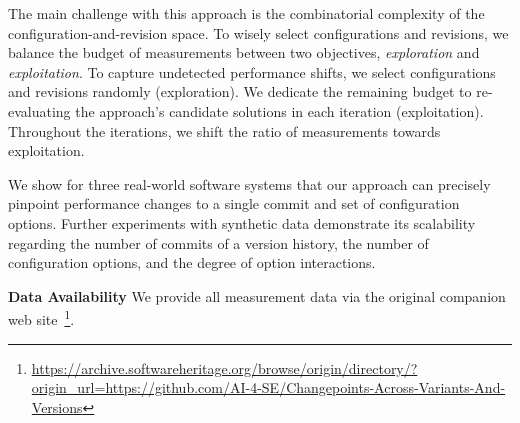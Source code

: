 \documentclass[utf8,biblatex]{lni}
\begin{document}
The main challenge with this approach is the combinatorial complexity of the configuration-and-revision space. To wisely select configurations and revisions, we balance the budget of measurements between two objectives, \textit{exploration} and \textit{exploitation}. To capture undetected performance shifts, we select configurations and revisions randomly (exploration). We dedicate the remaining budget to re-evaluating the approach’s candidate solutions in each iteration (exploitation). Throughout the iterations, we shift the ratio of measurements towards exploitation. 

We show for three real-world software systems that our approach can precisely pinpoint performance changes to a single commit and set of configuration options. Further experiments with synthetic data demonstrate its scalability regarding the number of commits of a version history, the number of configuration options, and the degree of option interactions.

\textbf{Data Availability}
We provide all measurement data via the original companion web site~\footnote{\url{https://archive.softwareheritage.org/browse/origin/directory/?origin_url=https://github.com/AI-4-SE/Changepoints-Across-Variants-And-Versions}}.
\printbibliography
\end{document}
